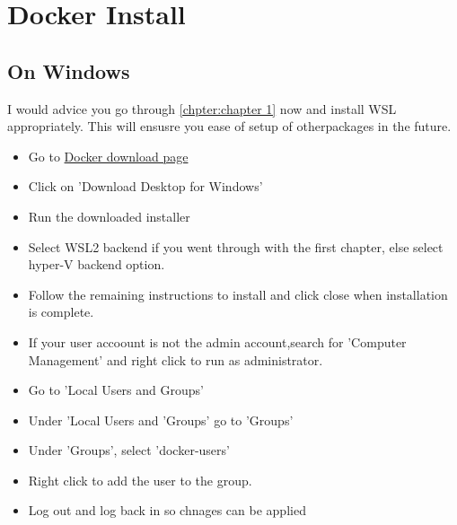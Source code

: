 \documentclass[11pt,fleqn]{book} %
\begin{document}
\chapter{Docker Install}
\section{On Windows}
I would advice you go through \ref{chpter:chapter 1} now and install WSL appropriately. This will ensusre you ease of setup of 
otherpackages in the future.
\begin{itemize}
    \item Go to \href{https://docs.docker.com/desktop/install/windows-install/}{Docker download page}
    \item Click on 'Download Desktop for Windows'
    \item Run the downloaded installer
    \item Select WSL2 backend if you went through with the first chapter, else select hyper-V backend option.
    \item Follow the remaining instructions to install and click close when installation is complete.
    \item If your user accoount is not the admin account,search for 'Computer Management' and right click to run as administrator.
    \item Go to 'Local Users and Groups'
    \item Under 'Local Users and 'Groups' go to 'Groups'
    \item Under 'Groups', select 'docker-users'
    \item Right click to add the user to the group.
    \item Log out and log back in so chnages can be applied 
\end{itemize}
\end{document}
